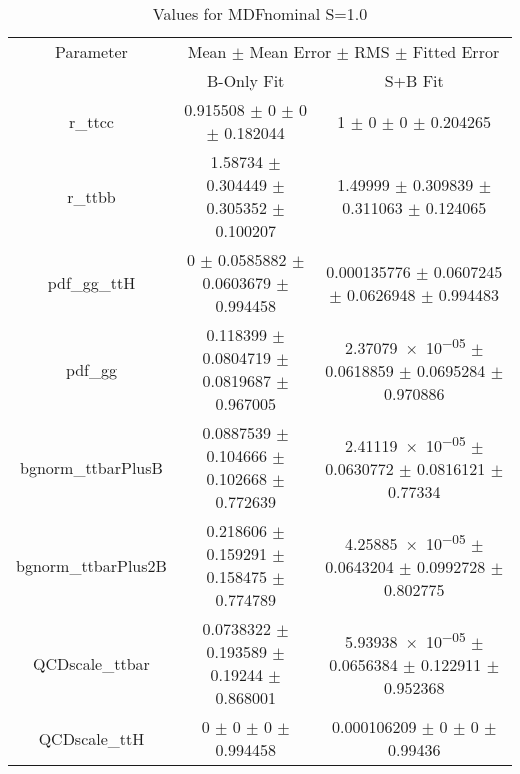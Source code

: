 \begin{table}
\centering
\caption{Values for MDFnominal S=1.0}
\begin{tabular}{ccc}
\toprule
Parameter & \multicolumn{2}{c}{Mean $\pm$ Mean Error $\pm$ RMS $\pm$ Fitted Error}\\
 & B-Only Fit & S+B Fit\\
\midrule
r\_ttcc & \num{0.915508} $\pm$ \num{0} $\pm$ \num{0} $\pm$ \num{0.182044} & \num{1} $\pm$ \num{0} $\pm$ \num{0} $\pm$ \num{0.204265}\\
r\_ttbb & \num{1.58734} $\pm$ \num{0.304449} $\pm$ \num{0.305352} $\pm$ \num{0.100207} & \num{1.49999} $\pm$ \num{0.309839} $\pm$ \num{0.311063} $\pm$ \num{0.124065}\\
pdf\_gg\_ttH & \num{0} $\pm$ \num{0.0585882} $\pm$ \num{0.0603679} $\pm$ \num{0.994458} & \num{0.000135776} $\pm$ \num{0.0607245} $\pm$ \num{0.0626948} $\pm$ \num{0.994483}\\
pdf\_gg & \num{0.118399} $\pm$ \num{0.0804719} $\pm$ \num{0.0819687} $\pm$ \num{0.967005} & \num{2.37079e-05} $\pm$ \num{0.0618859} $\pm$ \num{0.0695284} $\pm$ \num{0.970886}\\
bgnorm\_ttbarPlusB & \num{0.0887539} $\pm$ \num{0.104666} $\pm$ \num{0.102668} $\pm$ \num{0.772639} & \num{2.41119e-05} $\pm$ \num{0.0630772} $\pm$ \num{0.0816121} $\pm$ \num{0.77334}\\
bgnorm\_ttbarPlus2B & \num{0.218606} $\pm$ \num{0.159291} $\pm$ \num{0.158475} $\pm$ \num{0.774789} & \num{4.25885e-05} $\pm$ \num{0.0643204} $\pm$ \num{0.0992728} $\pm$ \num{0.802775}\\
QCDscale\_ttbar & \num{0.0738322} $\pm$ \num{0.193589} $\pm$ \num{0.19244} $\pm$ \num{0.868001} & \num{5.93938e-05} $\pm$ \num{0.0656384} $\pm$ \num{0.122911} $\pm$ \num{0.952368}\\
QCDscale\_ttH & \num{0} $\pm$ \num{0} $\pm$ \num{0} $\pm$ \num{0.994458} & \num{0.000106209} $\pm$ \num{0} $\pm$ \num{0} $\pm$ \num{0.99436}\\
\bottomrule
\end{tabular}
\end{table}